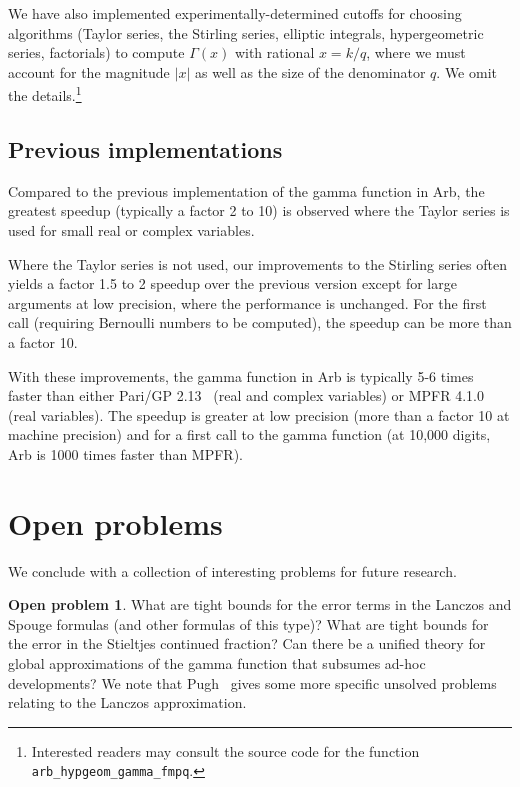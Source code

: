 \documentclass[reqno]{amsart}
\theoremstyle{definition}
\newtheorem{problem}[theorem]{Open problem}
\begin{document}
We have also implemented experimentally-determined cutoffs for choosing
algorithms (Taylor series, the Stirling series,
elliptic integrals, hypergeometric series, factorials)
to compute $\Gamma(x)$ with rational $x = k/q$, where we must account
for the magnitude $|x|$ as well as the size
of the denominator $q$. We omit the details.\footnote{Interested readers may consult the source code
for the function \texttt{arb\_hypgeom\_gamma\_fmpq}.}

\subsection{Previous implementations}

Compared to the previous implementation of the gamma function in Arb,
the greatest speedup (typically a factor 2 to 10)
is observed where the Taylor series is used
for small real or complex variables.

Where the Taylor series is not used, our improvements to the Stirling series
often yields a factor 1.5 to 2 speedup
over the previous version
except for large arguments at low precision,
where the performance is unchanged.
For the first call (requiring Bernoulli numbers to be computed),
the speedup can be more than a factor 10.

With these improvements, the gamma function in Arb is
typically 5-6 times faster
than either Pari/GP 2.13~\cite{Par2021} (real and complex variables) or MPFR 4.1.0~\cite{Fousse2007} (real variables).
The speedup is greater at low precision (more than a factor 10 at machine precision)
and for a first call to the gamma function (at 10,000 digits, Arb is 1000 times
faster than MPFR).



\section{Open problems}

\label{sect:openprob}

We conclude with a collection of interesting problems
for future research.

\begin{problem}
What are tight bounds for the error terms in the Lanczos and Spouge formulas
(and other formulas of this type)? What are tight bounds for the error in the
Stieltjes continued fraction?
Can there be a unified theory for global approximations of the gamma function
that subsumes ad-hoc developments?
We note that Pugh~\cite[Chapter 11]{pugh2004analysis} gives some more specific
unsolved problems relating to the Lanczos approximation.
\end{problem}
\end{document}
